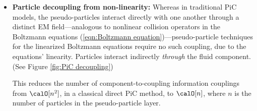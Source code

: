     \begin{itemize}
        \item  {\bf Particle decoupling from non-linearity:} Whereas in traditional PiC models, the pseudo-particles interact directly with one another through a distinct EM field---analogous to nonlinear collision operators in the Boltzmann equations (\ref{eqn:Boltzmann equation})---pseudo-particle techniques for the linearized Boltzmann equations require no such coupling, due to the equations' linearity. Particles interact indirectly \emph{through} the fluid component. (See Figure \ref{fig:PiC decoupling})

        This reduces the number of component-to-coupling information couplings from $\calO[n^{2}]$, in a classical direct PiC method, to $\calO[n]$, where $n$ is the number of particles in the pseudo-particle layer.
        
        \begin{figure}[!ht]
            \centering
            \begin{subfigure}{0.5\textwidth}
                \centering
\end{subfigure}
\end{figure}
\end{itemize}
